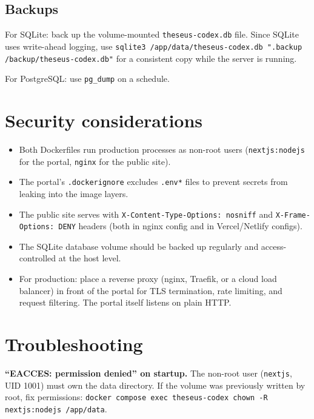 \documentclass[11pt,letterpaper]{article}
\newcommand{\file}[1]{\texttt{#1}}
\newcommand{\cmd}[1]{\texttt{#1}}
\begin{document}
\subsection{Backups}

For SQLite: back up the volume-mounted \file{theseus-codex.db} file. Since SQLite uses write-ahead logging, use \cmd{sqlite3 /app/data/theseus-codex.db ".backup /backup/theseus-codex.db"} for a consistent copy while the server is running.

For PostgreSQL: use \cmd{pg\_dump} on a schedule.

\section{Security considerations}

\begin{itemize}[leftmargin=1.5em,itemsep=0.2em]
  \item Both Dockerfiles run production processes as non-root users (\cmd{nextjs:nodejs} for the portal, \cmd{nginx} for the public site).
  \item The portal's \file{.dockerignore} excludes \file{.env*} files to prevent secrets from leaking into the image layers.
  \item The public site serves with \cmd{X-Content-Type-Options: nosniff} and \cmd{X-Frame-Options: DENY} headers (both in nginx config and in Vercel/Netlify configs).
  \item The SQLite database volume should be backed up regularly and access-controlled at the host level.
  \item For production: place a reverse proxy (nginx, Traefik, or a cloud load balancer) in front of the portal for TLS termination, rate limiting, and request filtering. The portal itself listens on plain HTTP.
\end{itemize}

\section{Troubleshooting}

\textbf{``EACCES: permission denied'' on startup.} The non-root user (\cmd{nextjs}, UID 1001) must own the data directory. If the volume was previously written by root, fix permissions: \cmd{docker compose exec theseus-codex chown -R nextjs:nodejs /app/data}.
\end{document}
